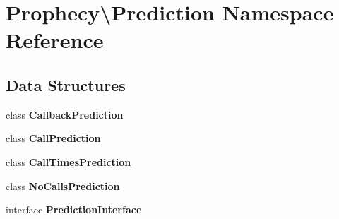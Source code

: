 \section{Prophecy\textbackslash{}Prediction Namespace Reference}
\label{namespace_prophecy_1_1_prediction}
\subsection*{Data Structures}
\begin{DoxyCompactItemize}
\item 
class {\bf Callback\+Prediction}
\item 
class {\bf Call\+Prediction}
\item 
class {\bf Call\+Times\+Prediction}
\item 
class {\bf No\+Calls\+Prediction}
\item 
interface {\bf Prediction\+Interface}
\end{DoxyCompactItemize}
